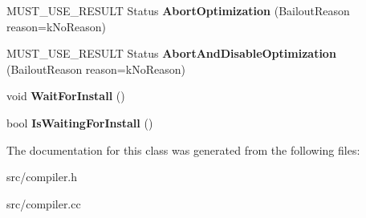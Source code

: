 \begin{DoxyCompactItemize}
\item 
\hypertarget{classv8_1_1internal_1_1_optimized_compile_job_a00c095176a910e42d1bca7eed6100d89}{}M\+U\+S\+T\+\_\+\+U\+S\+E\+\_\+\+R\+E\+S\+U\+L\+T Status {\bfseries Abort\+Optimization} (Bailout\+Reason reason=k\+No\+Reason)\label{classv8_1_1internal_1_1_optimized_compile_job_a00c095176a910e42d1bca7eed6100d89}

\item 
\hypertarget{classv8_1_1internal_1_1_optimized_compile_job_af2942f083502b3912fdb514974823cd7}{}M\+U\+S\+T\+\_\+\+U\+S\+E\+\_\+\+R\+E\+S\+U\+L\+T Status {\bfseries Abort\+And\+Disable\+Optimization} (Bailout\+Reason reason=k\+No\+Reason)\label{classv8_1_1internal_1_1_optimized_compile_job_af2942f083502b3912fdb514974823cd7}

\item 
\hypertarget{classv8_1_1internal_1_1_optimized_compile_job_a34d24e15802326714c75af48d28b21b9}{}void {\bfseries Wait\+For\+Install} ()\label{classv8_1_1internal_1_1_optimized_compile_job_a34d24e15802326714c75af48d28b21b9}

\item 
\hypertarget{classv8_1_1internal_1_1_optimized_compile_job_aaa879123172ee91e30ea22a160b9c0a4}{}bool {\bfseries Is\+Waiting\+For\+Install} ()\label{classv8_1_1internal_1_1_optimized_compile_job_aaa879123172ee91e30ea22a160b9c0a4}

\end{DoxyCompactItemize}


The documentation for this class was generated from the following files\+:\begin{DoxyCompactItemize}
\item 
src/compiler.\+h\item 
src/compiler.\+cc\end{DoxyCompactItemize}
